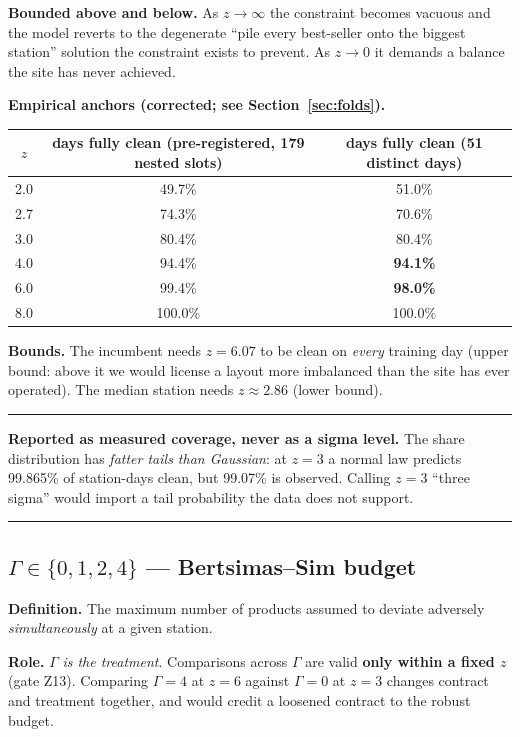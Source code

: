 \documentclass[11pt,a4paper]{article}
\newenvironment{keybox}
  {\par\medskip\noindent\rule{\linewidth}{0.9pt}\par\nobreak\smallskip\ignorespaces}
  {\par\smallskip\nobreak\noindent\rule{\linewidth}{0.9pt}\par\medskip}
\begin{document}
\textbf{Bounded above and below.} As $z\to\infty$ the constraint becomes
vacuous and the model reverts to the degenerate ``pile every best-seller onto
the biggest station'' solution the constraint exists to prevent. As $z\to0$ it
demands a balance the site has never achieved.

\textbf{Empirical anchors (corrected; see Section~\ref{sec:folds}).}

\begin{center}
\begin{tabular}{ccc}
\toprule
$z$ & days fully clean (pre-registered, 179 nested slots) & days fully clean (\textbf{51 distinct days}) \\
\midrule
2.0 & 49.7\% & 51.0\% \\
2.7 & 74.3\% & 70.6\% \\
3.0 & 80.4\% & 80.4\% \\
4.0 & 94.4\% & \textbf{94.1\%} \\
6.0 & 99.4\% & \textbf{98.0\%} \\
8.0 & 100.0\% & 100.0\% \\
\bottomrule
\end{tabular}
\end{center}

\textbf{Bounds.} The incumbent needs $z=6.07$ to be clean on \emph{every}
training day (upper bound: above it we would license a layout more imbalanced
than the site has ever operated). The median station needs $z\approx2.86$
(lower bound).

\begin{keybox}
\textbf{Reported as measured coverage, never as a sigma level.} The share
distribution has \emph{fatter tails than Gaussian}: at $z=3$ a normal law
predicts 99.865\% of station-days clean, but 99.07\% is observed. Calling
$z=3$ ``three sigma'' would import a tail probability the data does not support.
\end{keybox}

\subsection{\texorpdfstring{$\Gamma\in\{0,1,2,4\}$}{Gamma} --- Bertsimas--Sim budget}

\textbf{Definition.} The maximum number of products assumed to deviate
adversely \emph{simultaneously} at a given station.

\textbf{Role.} $\Gamma$ \emph{is the treatment}. Comparisons across $\Gamma$
are valid \textbf{only within a fixed $z$} (gate Z13). Comparing $\Gamma=4$ at
$z=6$ against $\Gamma=0$ at $z=3$ changes contract and treatment together, and
would credit a loosened contract to the robust budget.
\end{document}

